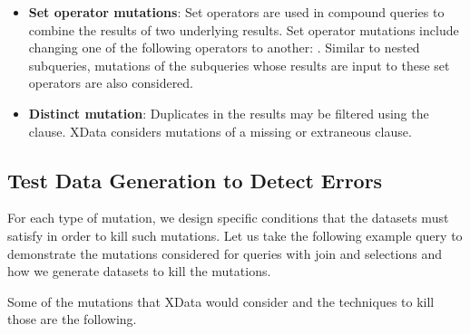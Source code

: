 \begin{itemize}
    \item \textbf{Set operator mutations}: Set operators are used in compound queries to combine the results of two underlying results. Set operator mutations include changing one of the following operators to another: . Similar to nested subqueries, mutations of the subqueries whose results are input to these set operators are also considered. 
    \item \textbf{Distinct mutation}: Duplicates in the results may be filtered using the  clause. XData considers mutations of a missing or extraneous  clause.
\end{itemize}

\subsection{Test Data Generation to Detect Errors}
For each type of mutation, we design specific conditions that the datasets must satisfy in order to kill such mutations. Let us take the following example query to demonstrate the mutations considered for queries with join and selections and how we generate datasets to kill the mutations.


Some of the mutations that XData would consider and the techniques to kill those are the following. 

